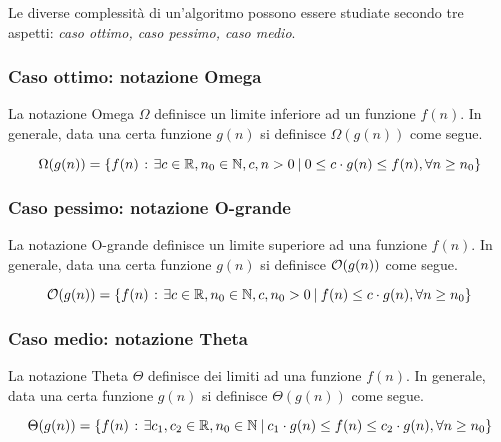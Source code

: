 \documentclass{subfiles}
\begin{document}
Le diverse complessità di un'algoritmo possono essere studiate secondo tre aspetti: \emph{caso ottimo, caso pessimo, caso medio}.

\subsubsection{Caso ottimo: notazione Omega}
La notazione Omega \(\Omega\) definisce un limite inferiore ad un funzione \(f(n)\).
In generale, data una certa funzione \(g(n)\) si definisce \(\Omega(g(n))\) come segue.

\[
    \Omega(g(n)) = \left\{f(n) \operatorname{\: {:} \:} \exists c \in \mathbb{R}, n_{0} \in \mathbb{N}, c,n > 0 \:{|}\: 0 \le c \cdot g(n) \le f(n), \forall n \ge n_{0}\right\}
\]

\subsubsection{Caso pessimo: notazione O-grande}
La notazione O-grande definisce un limite superiore ad una funzione \(f(n)\).
In generale, data una certa funzione \(g(n)\) si definisce \(\order{g(n)}\) come segue.

\[
    \order{g(n)} = \set{f(n)}{\exists c \in \R, n_{0} \in \N , c, n_{0} > 0 \given f(n) \le c \cdot g(n), \forall n \ge n_{0}}
\]

\subsubsection{Caso medio: notazione Theta}
La notazione Theta \(\Theta\) definisce dei limiti ad una funzione \(f(n)\).
In generale, data una certa funzione \(g(n)\) si definisce \(\Theta(g(n))\) come segue.

\[
    \Theta(g(n)) = \left\{f(n) \operatorname{\: {:} \:} \exists c_{1}, c_{2} \in \mathbb{R}, n_{0} \in \mathbb{N} \:{|}\: c_{1} \cdot g(n) \le f(n) \le c_{2} \cdot g(n), \forall n \ge n_{0}\right\}
\]
\end{document}
